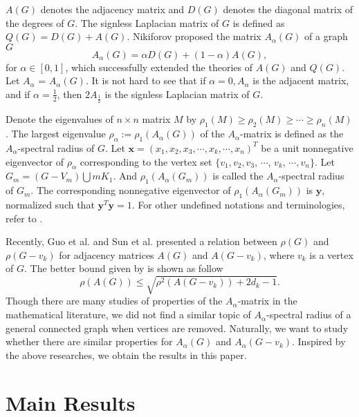 \documentclass[amsthm]{elsart}
\begin{document}
\qquad  $A(G)$ denotes the adjacency matrix and $D(G)$ denotes the diagonal matrix of the degrees of $G$. The signless Laplacian matrix of $G$ is defined as $Q(G) = D(G)+ A(G).$ Nikiforov \cite{2016Merging} proposed the matrix  $A_{\alpha}(G)$  of a graph $G$ $$A_{\alpha}(G) = \alpha D(G) +(1-\alpha)A(G),$$ for $\alpha \in [0,1]$, which successfully extended the theories of $A(G)$ and $Q(G)$.  Let $A_\alpha$ = $A_\alpha(G)$. It is not hard to see that if $\alpha =0, A_{\alpha}$ is the adjacent matrix, and if $\alpha = \frac{1}{2}$, then $2A_{\frac{1}{2}}$ is the signless Laplacian matrix of $G$.

\par \qquad  Denote  the eigenvalues of $n \times n$ matrix $M$ by $\rho_1(M) \geqslant \rho_2(M) \geqslant \cdots \geqslant \rho_n(M)$. The largest eigenvalue $\rho_\alpha := \rho_1(A_{\alpha}(G))$ of the $A_\alpha$-matrix is defined as the $A_{\alpha}$-spectral radius of $G$.
 Let  $\textbf{x} = (x_1, x_2,x_3, \cdots,x_k, \cdots, x_n)^T$ be a unit nonnegative eigenvector of $\rho_\alpha$ corresponding to  the  vertex set $\{v_1, v_2,v_3$, $\cdots$, $v_k$, $\cdots, v_n\}$.
 Let $G_m =(G - V_m)  \bigcup m K_1$. And $\rho_1(A_\alpha(G_m))$ is called the $A_\alpha$-spectral radius of $G_m$.
The corresponding nonnegative eigenvector of $\rho_1(A_\alpha(G_m))$ is
$\textbf{y}$, normalized such that $\textbf{y}^{T} \textbf{y} = 1$.
For other undefined notations and terminologies, refer to \cite{2001Introduction}.



\qquad Recently, Guo et al. \cite{2019Sharp} and Sun et al. \cite{2019A} presented a relation between $\rho(G)$ and $\rho(G- v_k)$ for adjacency matrices $A(G)$ and $A(G- v_k)$, where $v_k$ is a vertex of $G$. The better bound given by \cite{2019A} is shown as follow $$ \rho(A(G)) \leqslant \sqrt{\rho^2(A(G - v_k)) + 2 d_k - 1}. $$
Though there are many studies of properties of
the $A_\alpha$-matrix in the mathematical literature, we did not find a similar topic of $A_\alpha$-spectral radius of a general connected graph when vertices are removed.  Naturally, we want to study whether there are similar properties for $A_\alpha(G)$ and $A_\alpha(G-v_k)$. Inspired by the above researches, we obtain the results in this paper.



\section{Main Results}
\end{document}
